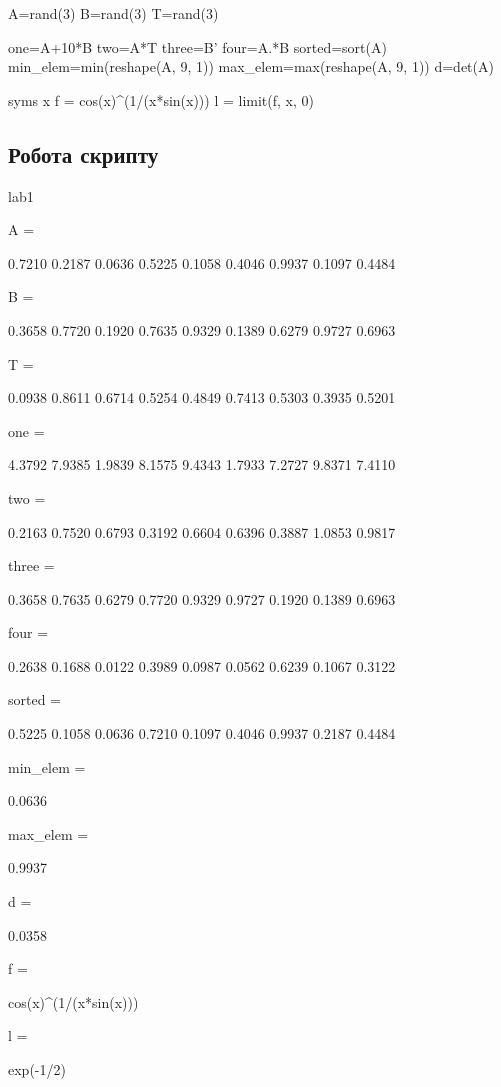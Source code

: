 \begin{DoxyCode}
A=rand(3)
B=rand(3)
T=rand(3)

one=A+10*B
two=A*T
three=B'
four=A.*B
sorted=sort(A)
min\_elem=min(reshape(A, 9, 1))
max\_elem=max(reshape(A, 9, 1))
d=det(A)

syms x
f = cos(x)^(1/(x*sin(x)))
l = limit(f, x, 0)
\end{DoxyCode}
\hypertarget{index_autotoc_md4}{}\subsection{Робота скрипту}\label{index_autotoc_md4}

\begin{DoxyCode}
lab1

A =

    0.7210    0.2187    0.0636
    0.5225    0.1058    0.4046
    0.9937    0.1097    0.4484


B =

    0.3658    0.7720    0.1920
    0.7635    0.9329    0.1389
    0.6279    0.9727    0.6963


T =

    0.0938    0.8611    0.6714
    0.5254    0.4849    0.7413
    0.5303    0.3935    0.5201


one =

    4.3792    7.9385    1.9839
    8.1575    9.4343    1.7933
    7.2727    9.8371    7.4110


two =

    0.2163    0.7520    0.6793
    0.3192    0.6604    0.6396
    0.3887    1.0853    0.9817


three =

    0.3658    0.7635    0.6279
    0.7720    0.9329    0.9727
    0.1920    0.1389    0.6963


four =

    0.2638    0.1688    0.0122
    0.3989    0.0987    0.0562
    0.6239    0.1067    0.3122


sorted =

    0.5225    0.1058    0.0636
    0.7210    0.1097    0.4046
    0.9937    0.2187    0.4484


min\_elem =

    0.0636


max\_elem =

    0.9937


d =

    0.0358


f =

cos(x)^(1/(x*sin(x)))


l =

exp(-1/2)
\end{DoxyCode}
 